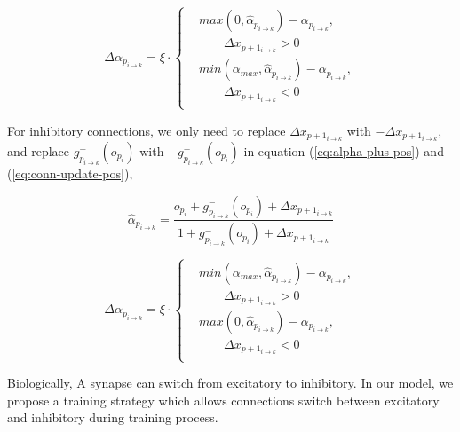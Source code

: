 \documentclass[conference]{IEEEtran}
\begin{document}
\begin{equation}
    \Delta\alpha_{p_{i\rightarrow{k}}} =\xi\cdot
    \left\{
        \begin{aligned}
            &max\left(0,\hat{\alpha}_{p_{i\rightarrow{k}}}\right)-\alpha_{p_{i\rightarrow{k}}},\\
            &\quad\quad\Delta x_{p+1_{i\rightarrow{k}}}>0\\
            &min\left(\alpha_{max},\hat{\alpha}_{p_{i\rightarrow{k}}}\right)-\alpha_{p_{i\rightarrow{k}}},\\
            &\quad\quad\Delta x_{p+1_{i\rightarrow{k}}}<0\\
        \end{aligned}
        \right.
    \label{eq:conn-update-pos}
\end{equation}

For inhibitory connections, we only need to replace
$\Delta x_{p+1_{i\rightarrow{k}}}$ with $-\Delta x_{p+1_{i\rightarrow{k}}}$,
and replace $g^{+}_{p_{i\rightarrow{k}}}(o_{p_i})$ with
$-g^{-}_{p_{i\rightarrow{k}}}(o_{p_i})$ in equation (\ref{eq:alpha-plus-pos})
and (\ref{eq:conn-update-pos}),

\begin{equation}
    \hat{\alpha}_{p_{i\rightarrow{k}}}=
        \frac{ o_{p_i}+g^{-}_{p_{i\rightarrow{k}}}(o_{p_i})+\Delta x_{p+1_{i\rightarrow{k}}} }{
        1+g^{-}_{p_{i\rightarrow{k}}}(o_{p_i})+\Delta x_{p+1_{i\rightarrow{k}}} }
    \label{eq:alpha-plus-neg}
\end{equation}

\begin{equation}
    \Delta\alpha_{p_{i\rightarrow{k}}} =\xi\cdot
    \left\{
        \begin{aligned}
            &min\left(\alpha_{max},\hat{\alpha}_{p_{i\rightarrow{k}}}\right)-\alpha_{p_{i\rightarrow{k}}},\\
            &\quad\quad\Delta x_{p+1_{i\rightarrow{k}}}>0\\
            &max\left(0,\hat{\alpha}_{p_{i\rightarrow{k}}}\right)-\alpha_{p_{i\rightarrow{k}}},\\
            &\quad\quad\Delta x_{p+1_{i\rightarrow{k}}}<0\\
        \end{aligned}
        \right.
    \label{eq:conn-update-neg}
\end{equation}

Biologically, A synapse can switch from excitatory to
inhibitory\cite{ganguly2001gaba}. In our model, we propose
a training strategy which allows connections switch between
excitatory and inhibitory during training process.
\end{document}
